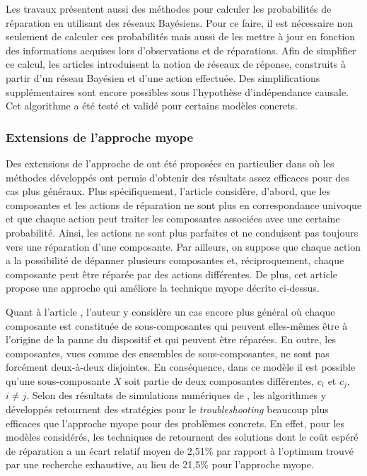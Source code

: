 \documentclass[a4paper,11pt]{article}
\theoremstyle{plain}
\begin{document}
Les travaux \cite{heckerman1994troubleshooting, Heckerman_1995} présentent aussi des méthodes pour calculer les probabilités de réparation en utilisant des réseaux Bayésiens. Pour ce faire, il est nécessaire non seulement de calculer ces probabilités mais aussi de les mettre à jour en fonction des informations acquises lors d'observations et de réparations. Afin de simplifier ce calcul, les articles introduisent la notion de réseaux de réponse, construits à partir d'un réseau Bayésien et d'une action effectuée. Des simplifications supplémentaires sont encore possibles sous l'hypothèse d'indépendance causale. Cet algorithme a été testé et validé pour certains modèles concrets.

\subsubsection{Extensions de l'approche myope}

Des extensions de l'approche de \cite{heckerman1994troubleshooting, Heckerman_1995} ont été proposées en particulier dans \cite{Jensen_2001, Langseth_2003} où les méthodes développés ont permis d'obtenir des résultats assez efficaces pour des cas plus généraux. Plus spécifiquement, l’article \cite{Jensen_2001} considère, d’abord, que les composantes et les actions de réparation ne sont plus en correspondance univoque et que chaque action peut traiter les composantes associées avec une certaine probabilité. Ainsi, les actions ne sont plus parfaites et ne conduisent pas toujours vers une réparation d’une composante. Par ailleurs, on suppose que chaque action a la possibilité de dépanner plusieurs composantes et, réciproquement, chaque composante peut être réparée par des actions différentes. De plus, cet article propose une approche qui améliore la technique myope décrite ci-dessus. %

Quant à l’article \cite{Langseth_2003}, l'auteur y considère un cas encore plus général où chaque composante est constituée de sous-composantes qui peuvent elles-mêmes être à l'origine de la panne du dispositif et qui peuvent être réparées. En outre, les composantes, vues comme des ensembles de sous-composantes, ne sont pas forcément deux-à-deux disjointes. En conséquence, dans ce modèle il est possible qu’une sous-composante $X$ soit partie de deux composantes différentes, $c_i$ et $c_j$, $i \neq j$. Selon des résultats de simulations numériques de \cite{Langseth_2003}, les algorithmes y développés retournent des stratégies pour le \emph{troubleshooting} beaucoup plus efficaces que l'approche myope pour des problèmes concrets. En effet, pour les modèles considérés, les techniques de \cite{Jensen_2001, Langseth_2003} retournent des solutions dont le coût espéré de réparation a un écart relatif moyen de 2,51\% par rapport à l’optimum trouvé par une recherche exhaustive, au lieu de 21,5\% pour l’approche myope.
\end{document}
